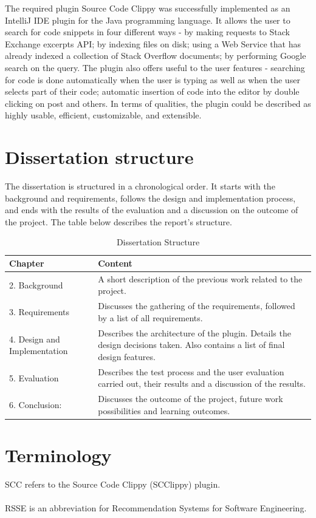\documentclass{l4proj}
\begin{document}
The required plugin Source Code Clippy was successfully implemented as an IntelliJ IDE plugin for the Java programming language. It allows the user to search for code snippets in four different ways - by making requests to Stack Exchange excerpts API; by indexing files on disk; using a Web Service that has already indexed a collection of Stack Overflow documents; by performing Google search on the query. The plugin also offers useful to the user features - searching for code is done automatically when the user is typing as well as when the user selects part of their code; automatic insertion of code into the editor by double clicking on post and others.  
In terms of qualities, the plugin could be described as highly usable, efficient, customizable, and extensible.

\section{Dissertation structure}
The dissertation is structured in a chronological order. It starts with the background and requirements, follows the design and implementation process, and ends with the results of the evaluation and a discussion on the outcome of the project. The table below describes the report's structure.

\begin{table}[h]
\caption{Dissertation Structure}
\centering
\def\arraystretch{1.5}
\begin{tabular}{p{3cm}p{12cm}}
\hline
Chapter & Content \\
\hline
2. Background  & A short description of the previous work related to the project. \\
3. Requirements   & Discusses the gathering of the requirements, followed by a list of all requirements. \\
4. Design and Implementation  & Describes the architecture of the plugin. Details the design decisions taken. Also contains a list of final design features.\\
5. Evaluation  & Describes the test process and the user evaluation carried out, their results and a discussion of the results. \\
6. Conclusion: & Discusses the outcome of the project, future work possibilities and learning outcomes.  \\
\hline
\end{tabular}
\label{table:reportStructure}
\end{table}


\section{Terminology}
SCC refers to the Source Code Clippy (SCClippy) plugin.
\\
\\
RSSE is an abbreviation for Recommendation Systems for Software Engineering.
\end{document}
